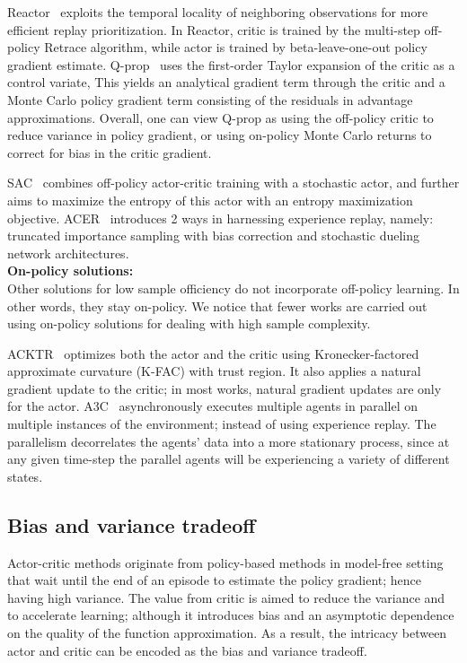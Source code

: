 Reactor~\cite{Gruslys2018} exploits the temporal locality of neighboring observations for
more efficient replay prioritization.
In Reactor, critic is trained by the multi-step off-policy Retrace algorithm,
while actor is trained by beta-leave-one-out policy gradient estimate.
Q-prop~\cite{GuLilGhaTurLev17} uses the first-order Taylor expansion of the critic as a control variate,
This yields an analytical gradient term through the critic and
a Monte Carlo policy gradient term consisting of the residuals in advantage approximations.
Overall, one can view Q-prop as
using the off-policy critic to reduce variance in policy gradient, or
using on-policy Monte Carlo returns to correct for bias in the critic gradient.

SAC~\cite{abs-1801-01290} combines off-policy actor-critic training with a stochastic actor, and
further aims to maximize the entropy of this actor with an entropy maximization objective.
ACER~\cite{WangBHMMKF16} introduces 2 ways in harnessing experience replay, namely:
truncated importance sampling with bias correction and
stochastic dueling network architectures.\\

\noindent
\textbf{On-policy solutions:}\\
Other solutions for low sample officiency do not incorporate off-policy learning.
In other words, they stay on-policy.
We notice that fewer works are carried out using on-policy solutions for dealing with high sample complexity.

ACKTR~\cite{NIPS2017_7112} optimizes both the actor and the critic using
Kronecker-factored approximate curvature (K-FAC) with trust region.
It also applies a natural gradient update to the critic;
in most works, natural gradient updates are only for the actor.
A3C~\cite{pmlr-v48-mniha16} asynchronously executes multiple agents in parallel on multiple instances of the environment;
instead of using experience replay.
The parallelism decorrelates the agents’ data into a more stationary process, since
at any given time-step the parallel agents will be experiencing a variety of different states.

\subsection{Bias and variance tradeoff}
Actor-critic methods originate from policy-based methods in model-free setting that
wait until the end of an episode to estimate the policy gradient; hence having high variance.
The value from critic is aimed to reduce the variance and to accelerate learning;
although it introduces bias and an asymptotic dependence on the quality of the function approximation.
As a result, the intricacy between actor and critic can be encoded as the bias and variance tradeoff.

